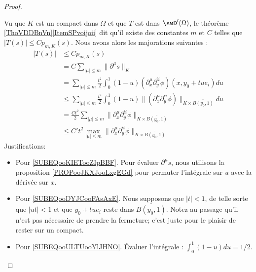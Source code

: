 \begin{proof}
\begin{subproof}
		Vu que \( K\) est un compact dans \( \Omega\) et que \( T\) est dans \( \swD'(\Omega)\), le théorème \ref{ThoVDDBnVn}\ref{ItemSPvoijoii} dit qu'il existe des constantes \( m\) et \( C\) telles que \( | T(s) |\leq Cp_{m,K}(s)\). Nous avons alors les majorations suivantes :
		\begin{subequations}        \label{SUBEQSooYPLGooOFMSyJ}
			\begin{align}
				| T(s) | & \leq C p_{m,K}(s)                                                                                                                                                   \\
				         & =C\sum_{| \mu |\leq m}\| \partial^{\mu}s \|_K                                                                                                                       \\
				         & =\sum_{|\mu|\leq m}\frac{ t^2 }{ 2 }\int_0^1(1-u)(\partial_x^{\mu}\partial_y^{ii}\phi)(x,y_0+tue_i)du       \label{SUBEQooKIETooZIpBBF}                             \\
				         & \leq\sum_{|\mu|\leq m}\frac{ t^2 }{ 2 }\int_0^1(1-u)\| (\partial_x^{\mu}\partial_y^{ii}\phi)\|_{K\times \overline{ B(y_0,1) }} du       \label{SUBEQooDYJCooFAsAxE} \\
				         & =\frac{ Ct^2 }{2}\sum_{| \mu |\leq m}\| \partial_x^{\mu}\partial_y^{ii}\phi \|_{K\times \overline{ B(y_0,1) }}  \label{SUBEQooULTUooYlJHNO}                         \\
				         & \leq C't^2 \max_{| \mu |\leq m}\| \partial_x^{\mu}\partial_y^{ii}\phi \|_{K\times \overline{ B(y_0,1) }}  \label{SUBEQooQENJooOgJuxj}
			\end{align}
		\end{subequations}
		Justifications:
		\begin{itemize}
			\item Pour \eqref{SUBEQooKIETooZIpBBF}. Pour évaluer \( \partial^{\mu}s\), nous utilisons la proposition \ref{PROPooJKXJooLxgEGd} pour permuter l'intégrale sur \( u\) avec la dérivée sur \( x\).
			\item Pour \eqref{SUBEQooDYJCooFAsAxE}. Nous supposons que \( | t |<1\), de telle sorte que \( | ut |<1\) et que \( y_0+tue_i\) reste dans \( \overline{ B(y_0,1) }\). Notez au passage qu'il n'est pas nécessaire de prendre la fermeture; c'est juste pour le plaisir de rester sur un compact.
			\item Pour \eqref{SUBEQooULTUooYlJHNO}. Évaluer l'intégrale : \( \int_0^1(1-u)du=1/2\).

\end{itemize}
\end{subproof}
\end{proof}

